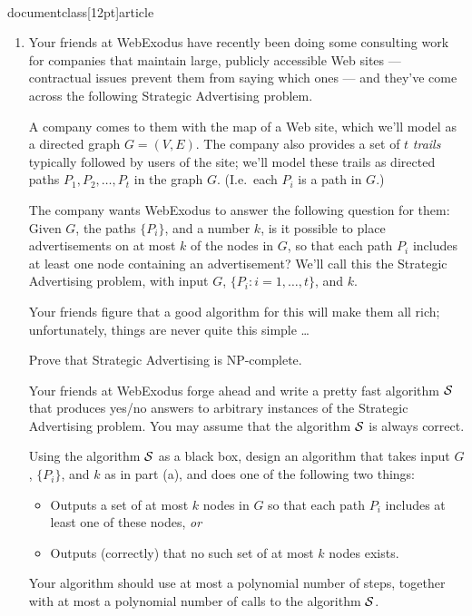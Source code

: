 \\documentclass[12pt]{article}
\begin{document}
\begin{enumerate}
{}



\item

Your friends at WebExodus have recently been 
doing some consulting work for companies that
maintain large, publicly accessible Web sites ---
contractual issues prevent them from saying which ones ---
and they've come across the following
{\sc Strategic Advertising} problem.

A company comes to them with the map of a Web site,
which we'll model as a directed graph $G = (V,E)$.
The company also provides a set of $t$ {\em trails}
typically followed by users of the site;
we'll model these trails as directed paths
$P_1, P_2, \ldots, P_t$ in the graph $G$.
(I.e.~each $P_i$ is a path in $G$.)

The company wants WebExodus to answer the following question
for them: Given $G$, the paths $\{P_i\}$, and a number $k$, is
it possible to place advertisements on at most $k$ of the nodes in $G$,
so that each path $P_i$ includes at least one node containing
an advertisement?
We'll call this the {\sc Strategic Advertising} problem,
with input $G$, $\{P_i : i = 1, \ldots, t\}$, and $k$.

Your friends figure that a good algorithm for this will
make them all rich; unfortunately, things are never quite this simple \ldots\

Prove that {\sc Strategic Advertising} is NP-complete.

Your friends at WebExodus forge ahead and write
a pretty fast algorithm $\cal S$ that produces
yes/no answers to arbitrary instances of the
{\sc Strategic Advertising} problem.
You may assume that the algorithm $\cal S$ is always correct.

Using the algorithm $\cal S$ as a black box,
design an algorithm that takes input $G$, $\{P_i\}$, and $k$
as in part (a), and does one of the following two things:
\begin{itemize}
\item Outputs a set of at most $k$ nodes in $G$ so that each path $P_i$
includes at least one of these nodes, {\em or}
\item Outputs (correctly) that no such set of at most $k$ nodes exists.
\end{itemize}
Your algorithm should use at most a polynomial number of steps, together
with at most a polynomial number of calls to the algorithm $\cal S$.


\end{enumerate}
\end{document}
